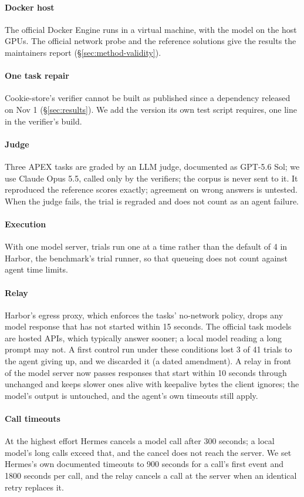 \paragraph{Docker host} The official Docker Engine runs in a virtual machine, with the model on the host GPUs. The official network probe and the reference solutions give the results the maintainers report (\S\ref{sec:method-validity}).
\paragraph{One task repair} Cookie-store's verifier cannot be built as published since a dependency released on Nov 1 (\S\ref{sec:results}). We add the version its own test script requires, one line in the verifier's build.
\paragraph{Judge} Three APEX tasks are graded by an LLM judge, documented as GPT-5.6 Sol; we use Claude Opus 5.5, called only by the verifiers; the corpus is never sent to it. It reproduced the reference scores exactly; agreement on wrong answers is untested. When the judge fails, the trial is regraded and does not count as an agent failure.
\paragraph{Execution} With one model server, trials run one at a time rather than the default of 4 in Harbor, the benchmark's trial runner, so that queueing does not count against agent time limits.
\paragraph{Relay} Harbor's egress proxy, which enforces the tasks' no-network policy, drops any model response that has not started within 15 seconds. The official task models are hosted APIs, which typically answer sooner; a local model reading a long prompt may not. A first control run under these conditions lost 3 of 41 trials to the agent giving up, and we discarded it (a dated amendment). A relay in front of the model server now passes responses that start within 10 seconds through unchanged and keeps slower ones alive with keepalive bytes the client ignores; the model's output is untouched, and the agent's own timeouts still apply.
\paragraph{Call timeouts} At the highest effort Hermes cancels a model call after 300 seconds; a local model's long calls exceed that, and the cancel does not reach the server. We set Hermes's own documented timeouts to 900 seconds for a call's first event and 1800 seconds per call, and the relay cancels a call at the server when an identical retry replaces it.
